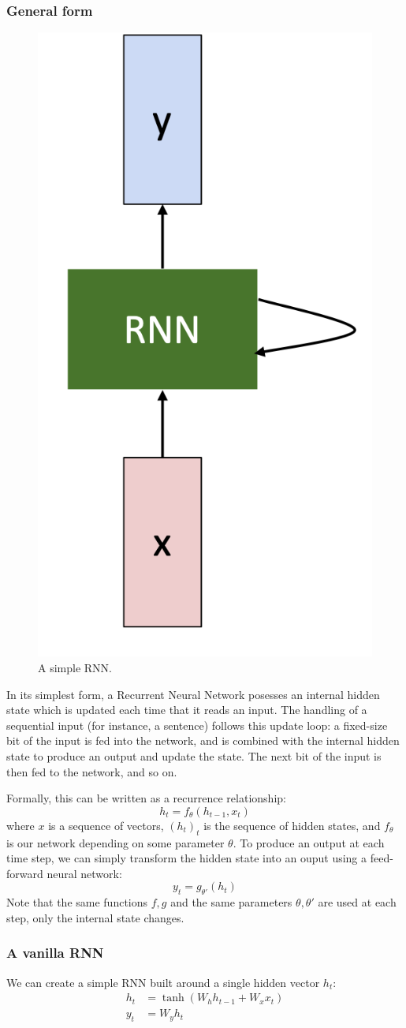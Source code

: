 \subsubsection{General form}
\begin{figure}
    \centering
    \includegraphics[width=.2\textwidth]{images/vanilla-rnn.png}
    \caption{A simple RNN.}
\end{figure}
In its simplest form, a Recurrent Neural Network posesses an internal hidden state which is updated each time that it reads an input. The handling of a sequential input (for instance, a sentence) follows this update loop: a fixed-size bit of the input is fed into the network, and is combined with the internal hidden state to produce an output and update the state. The next bit of the input is then fed to the network, and so on. 

Formally, this can be written as a recurrence relationship:
\begin{equation*}
    h_t = f_\theta(h_{t-1}, x_t)
\end{equation*}
where $x$ is a sequence of vectors, $(h_t)_t$ is the sequence of hidden states, and $f_\theta$ is our network depending on some parameter $\theta$. To produce an output at each time step, we can simply transform the hidden state into an ouput using a feed-forward neural network:
\begin{equation*}
    y_t = g_{\theta'}(h_t)
\end{equation*}
Note that the same functions $f, g$ and the same parameters $\theta, \theta'$ are used at each step, only the internal state changes.

\subsubsection{A vanilla RNN}
We can create a simple RNN built around a single hidden vector $h_t$:
\begin{equation*}
    \begin{aligned}
        h_t &= \tanh\left(W_h h_{t-1} + W_x x_t\right)\\
        y_t &= W_y h_t
    \end{aligned}
\end{equation*}

